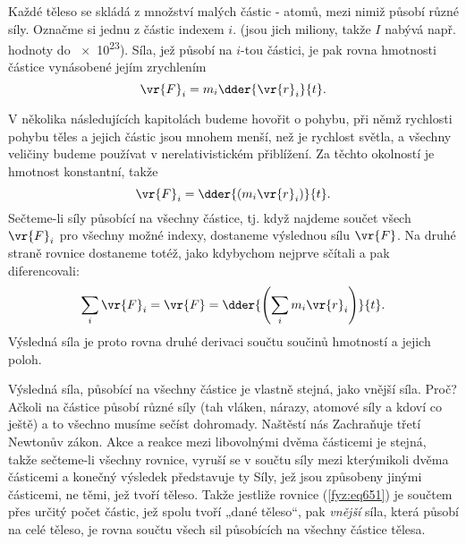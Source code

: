     Každé těleso se skládá z množství malých částic - atomů, mezi nimiž působí různé síly. Označme
    si jednu z částic indexem \(i\). (jsou jich miliony, takže \(I\) nabývá např. hodnoty do
    \num{e23}). Síla, jež působí na \(i\)-tou částici, je pak rovna hmotnosti částice vynásobené
    jejím zrychlením
    \begin{equation}\label{fyz:eq649}
      \vr{F}_i=m_i\dder{\vr{r}_i}{t}.
    \end{equation}
   
    V několika následujících kapitolách budeme hovořit o pohybu, při němž rychlosti pohybu těles a
    jejich částic jsou mnohem menší, než je rychlost světla, a všechny veličiny budeme používat v
    nerelativistickém přiblížení. Za těchto okolností je hmotnost konstantní, takže
    \begin{equation}\label{fyz:eq650}
      \vr{F}_i=\dder{(m_i\vr{r}_i)}{t}.
    \end{equation}
    Sečteme-li síly působící na všechny částice, tj. když najdeme součet všech \(\vr{F}_i\) pro
    všechny možné indexy, dostaneme výslednou sílu \(\vr{F}\). Na druhé straně rovnice dostaneme
    totéž, jako kdybychom nejprve sčítali a pak diferencovali:
    \begin{equation}\label{fyz:eq651}
      \sum_i\vr{F}_i=\vr{F}=\dder{\left(\sum_im_i\vr{r}_i\right)}{t}.
    \end{equation}
    Výsledná síla je proto rovna druhé derivaci součtu součinů hmotností a jejich poloh.

    Výsledná síla, působící na všechny částice je vlastně stejná, jako vnější síla. Proč? Ačkoli na
    částice působí různé síly (tah vláken, nárazy, atomové síly a kdoví co ještě) a to všechno
    musíme sečíst dohromady. Naštěstí nás Zachraňuje třetí Newtonův zákon. Akce a reakce mezi
    libovolnými dvěma částicemi je stejná, takže sečteme-li všechny rovnice, vyruší se v součtu síly
    mezi kterýmikoli dvěma částicemi a konečný výsledek představuje ty Síly, jež jsou způsobeny
    jinými částicemi, ne těmi, jež tvoří těleso. Takže jestliže rovnice (\ref {fyz:eq651}) je
    součtem přes určitý počet částic, jež spolu tvoří „dané těleso“, pak \emph{vnější} síla, která
    působí na celé těleso, je rovna součtu všech sil působících na všechny částice tělesa.

